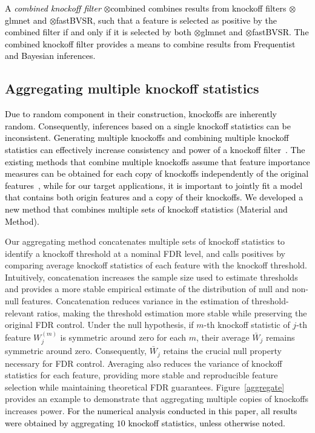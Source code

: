 \documentclass[12pt,Times]{article}
\def\cite{\citep}
\def\tcb{\textcolor{black}}
\begin{document}
\tcb{A  \emph{combined knockoff filter} \allowbreak$\otimes$combined combines results from knockoff filters $\otimes$glmnet and $\otimes$fastBVSR, such that a feature is selected as positive by the combined filter if and only if it is selected by both $\otimes$glmnet and $\otimes$fastBVSR. The combined knockoff filter provides a means to combine results from Frequentist and Bayesian inferences.} 



\subsection{Aggregating multiple knockoff statistics}
\tcb{Due to random component in their construction, knockoffs are inherently random. Consequently, inferences based on a single knockoff statistics can be inconsistent. Generating multiple knockoffs and combining multiple knockoff statistics can effectively increase consistency and power of a knockoff filter~\cite{msko,koscreen}. The existing methods that combine multiple knockoffs assume that feature importance measures can be obtained for each copy of knockoffs independently of the original features~\cite{koscreen}, while for our target applications, it is important to jointly fit a model that contains both origin features and a copy of their knockoffs. We developed a new method that combines multiple sets of knockoff statistics (Material and Method).}

Our aggregating method concatenates multiple sets of knockoff statistics to identify a knockoff threshold at a nominal FDR level, and calls positives by comparing average knockoff statistics of each feature with the knockoff threshold.   
Intuitively, concatenation increases the sample size used to estimate thresholds and provides a more stable empirical estimate of the distribution of null and non-null features. 
Concatenation reduces variance in the estimation of threshold-relevant ratios, making the threshold estimation more stable while preserving the original FDR control. 
Under the null hypothesis, if $m$-th knockoff statistic of $j$-th feature $W^{(m)}_j$ is symmetric around zero for each $m$, their average $\bar{W}_j$ remains symmetric around zero. Consequently, $\bar{W}_j$ retains the crucial null property necessary for FDR control. Averaging also reduces the variance of knockoff statistics for each feature, providing more stable and reproducible feature selection while maintaining theoretical FDR guarantees. 
Figure~\ref{aggregate} provides an example to demonstrate that aggregating multiple copies of knockoffs  increases power. 
\tcb{For the numerical analysis conducted in this paper, all results were obtained by aggregating $10$ knockoff statistics, unless otherwise noted.}
\end{document}
